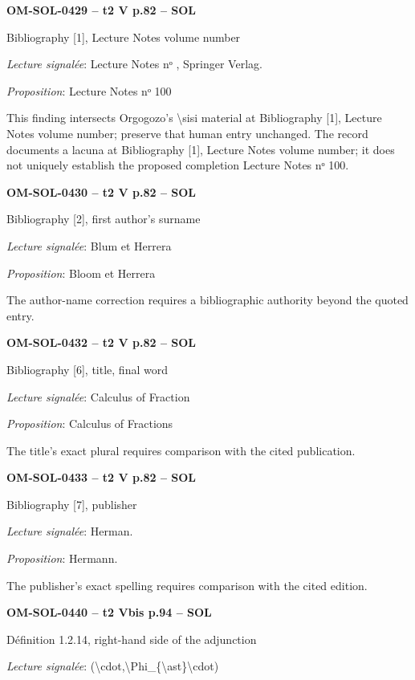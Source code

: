 \par\noindent\textbf{OM-SOL-0429 -- t2 V p.82 -- SOL}\par
Bibliography [1], Lecture Notes volume number\par
\emph{Lecture signalée}: Lecture Notes nᵒ , Springer Verlag.\par
\emph{Proposition}: Lecture Notes nᵒ 100\par
This finding intersects Orgogozo's \textbackslash{}sisi material at Bibliography [1], Lecture Notes volume number; preserve that human entry unchanged. The record documents a lacuna at Bibliography [1], Lecture Notes volume number; it does not uniquely establish the proposed completion Lecture Notes nᵒ 100.\par
\par\noindent\textbf{OM-SOL-0430 -- t2 V p.82 -- SOL}\par
Bibliography [2], first author's surname\par
\emph{Lecture signalée}: Blum et Herrera\par
\emph{Proposition}: Bloom et Herrera\par
The author-name correction requires a bibliographic authority beyond the quoted entry.\par
\par\noindent\textbf{OM-SOL-0432 -- t2 V p.82 -- SOL}\par
Bibliography [6], title, final word\par
\emph{Lecture signalée}: Calculus of Fraction\par
\emph{Proposition}: Calculus of Fractions\par
The title's exact plural requires comparison with the cited publication.\par
\par\noindent\textbf{OM-SOL-0433 -- t2 V p.82 -- SOL}\par
Bibliography [7], publisher\par
\emph{Lecture signalée}: Herman.\par
\emph{Proposition}: Hermann.\par
The publisher's exact spelling requires comparison with the cited edition.\par
\par\noindent\textbf{OM-SOL-0440 -- t2 Vbis p.94 -- SOL}\par
Définition 1.2.14, right-hand side of the adjunction\par
\emph{Lecture signalée}: (\textbackslash{}cdot,\textbackslash{}Phi\_\{\textbackslash{}ast\}\textbackslash{}cdot)\par
